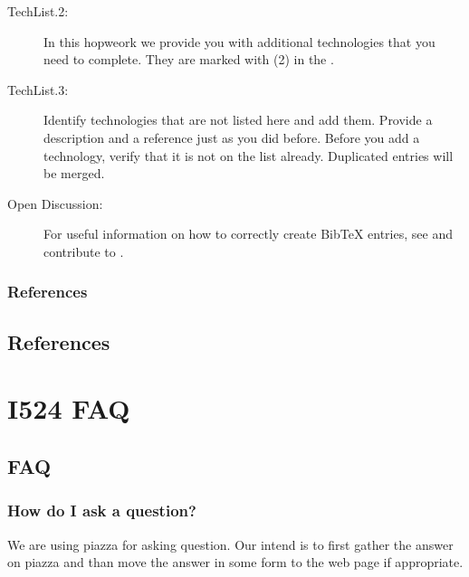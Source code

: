 \begin{description}
\item[{TechList.2:}] \leavevmode
In this hopweork we provide you with additional technologies that
you need to complete. They are marked with (2) in the {\hyperref[\detokenize{i524/hids-techs::doc}]{}}.

\item[{TechList.3:}] \leavevmode
Identify technologies that are not listed here and add   them.
Provide a description and a reference just as you did before. Before you
add a technology, verify that it is not on the  list
already.  Duplicated entries will be merged.

\item[{Open Discussion:}] \leavevmode
For useful information on how to correctly create BibTeX entries,
see and contribute to .

\end{description}


\subsection{References}
\label{\detokenize{i524/technologies:references}}



\section{References}
\label{\detokenize{references:references}}\label{\detokenize{references::doc}}



\chapter{I524 FAQ}
\label{\detokenize{notes:i524-faq}}

\section{FAQ}
\label{\detokenize{faq:faq}}\label{\detokenize{faq::doc}}

\subsection{How do I ask a question?}
\label{\detokenize{faq:how-do-i-ask-a-question}}
We are using piazza for asking question. Our intend is to first gather
the answer on piazza and than move the answer in some form to the web
page if appropriate.

